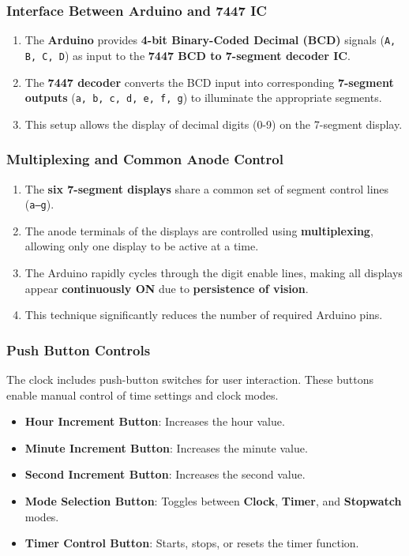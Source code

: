 \documentclass[journal]{IEEEtran}
\begin{document}
\subsubsection{Interface Between Arduino and 7447 IC}
\begin{enumerate}
    \item The \textbf{Arduino} provides \textbf{4-bit Binary-Coded Decimal (BCD)} signals (\texttt{A, B, C, D}) as input to the \textbf{7447 BCD to 7-segment decoder IC}.
    \item The \textbf{7447 decoder} converts the BCD input into corresponding \textbf{7-segment outputs} (\texttt{a, b, c, d, e, f, g}) to illuminate the appropriate segments.
    \item This setup allows the display of decimal digits (0-9) on the 7-segment display.
\end{enumerate}

\subsubsection{Multiplexing and Common Anode Control}
\begin{enumerate}
    \item The \textbf{six 7-segment displays} share a common set of segment control lines (\texttt{a--g}).
    \item The anode terminals of the displays are controlled using \textbf{multiplexing}, allowing only one display to be active at a time.
    \item The Arduino rapidly cycles through the digit enable lines, making all displays appear \textbf{continuously ON} due to \textbf{persistence of vision}.
    \item This technique significantly reduces the number of required Arduino pins.
\end{enumerate}

\subsubsection{Push Button Controls}
The clock includes push-button switches for user interaction. These buttons enable manual control of time settings and clock modes.

\begin{itemize}
    \item \textbf{Hour Increment Button}: Increases the hour value.
    \item \textbf{Minute Increment Button}: Increases the minute value.
    \item \textbf{Second Increment Button}: Increases the second value.
    \item \textbf{Mode Selection Button}: Toggles between \textbf{Clock}, \textbf{Timer}, and \textbf{Stopwatch} modes.
    \item \textbf{Timer Control Button}: Starts, stops, or resets the timer function.
\end{itemize}
\end{document}
